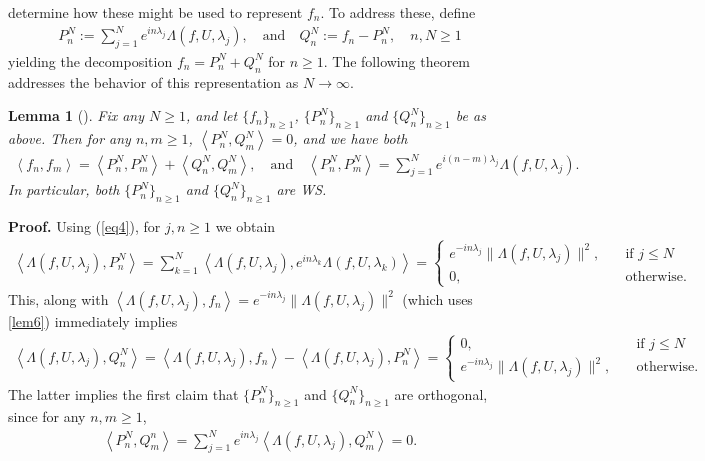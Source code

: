 \documentclass[11pt]{report}
\newcommand{\ip}[2]{\left\langle#1,#2\right\rangle }
\newcommand{\1}[1]{\mathbbm{1}_{\{#1\}}}
\newtheorem{lemma}{Lemma}[section]
\theoremstyle{definition}
\begin{document}
    determine how these might be used to represent $f_n$. To address these, define
    \begin{align}
        P^N_n:=\sum_{j=1}^Ne^{in\lambda_j}\Lambda(f,U,\lambda_j),\quad\text{and}\quad Q^N_n:=f_n-P^N_n,\quad n,N\geq 1
    \end{align}
    yielding the decomposition $f_n=P^N_n+Q^N_n$ for $n\geq 1$. The following theorem addresses the behavior of this
    representation as $N\rightarrow\infty$.
    \begin{lemma}[{\cite[\S6]{Fan_1946}}]\label{lem7}
        Fix any $N\geq 1$, and let $\{f_n\}_{n\geq 1}$, $\{P^N_n\}_{n\geq 1}$ and $\{Q^N_n\}_{n\geq 1}$ be as above. 
        Then for any $n,m\geq 1$, $\ip{P^N_n}{Q^N_m}=0$, and we have both
        \begin{align*}
            \ip{f_n}{f_m}=\ip{P^N_n}{P^N_m}+\ip{Q^N_n}{Q^N_m},\quad\text{and}\quad\ip{P^N_n}{P^N_m}=\sum_{j=1}^N e^{i(n-m)\lambda_j}\Lambda(f,U,\lambda_j).
        \end{align*}
        In particular, both $\{P^N_n\}_{n\geq 1}$ and $\{Q^N_n\}_{n\geq 1}$ are WS.
    \end{lemma}
    \noindent\textbf{Proof.} Using (\ref{eq4}), for $j,n\geq1$ we obtain
    \begin{align*}
        \ip{\Lambda(f,U,\lambda_j)}{P^N_n}=\sum_{k=1}^N\ip{\Lambda(f,U,\lambda_j)}{e^{in\lambda_k}\Lambda(f,U,\lambda_k)}=\begin{cases}
            e^{-in\lambda_j}\|\Lambda(f,U,\lambda_j)\|^2,\quad&\text{if $j\leq N$}\\
            0,\quad&\text{otherwise.}
        \end{cases}
    \end{align*}
    This, along with $\ip{\Lambda(f,U,\lambda_j)}{f_n}=e^{-in\lambda_j}\|\Lambda(f,U,\lambda_j)\|^2$ (which uses \ref{lem6}) immediately implies
    \begin{align*}
        \ip{\Lambda(f,U,\lambda_j)}{Q^N_n}=\ip{\Lambda(f,U,\lambda_j)}{f_n}-\ip{\Lambda(f,U,\lambda_j)}{P^N_n}=\begin{cases}
            0,\quad&\text{if $j\leq N$}\\
            e^{-in\lambda_j}\|\Lambda(f,U,\lambda_j)\|^2,\quad&\text{otherwise.}
        \end{cases}
    \end{align*}
    The latter implies the first claim that $\{P^N_n\}_{n\geq 1}$ and $\{Q^N_n\}_{n\geq 1}$ are orthogonal, since for any $n,m\geq 1$,
    \begin{align*}
        \ip{P^N_n}{Q^n_m}=\sum_{j=1}^Ne^{in\lambda_j}\ip{\Lambda(f,U,\lambda_j)}{Q^N_m}=0.
    \end{align*}
\end{document}

